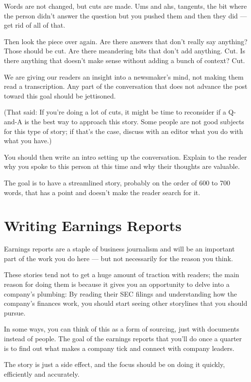 \documentclass[
  11pt,
  american,
  letterpaperpaper,
  extrafontsizes,onecolumn,openright
  ]{memoir}
\begin{document}
Words are not changed, but cuts are made. Ums and ahs, tangents, the bit where the person didn't answer the question but you pushed them and then they did --- get rid of all of that.

Then look the piece over again. Are there answers that don't really say anything? Those should be cut. Are there meandering bits that don't add anything. Cut. Is there anything that doesn't make sense without adding a bunch of context? Cut.

We are giving our readers an insight into a newsmaker's mind, not making them read a transcription. Any part of the conversation that does not advance the post toward this goal should be jettisoned.

(That said: If you're doing a lot of cuts, it might be time to reconsider if a Q-and-A is the best way to approach this story. Some people are not good subjects for this type of story; if that's the case, discuss with an editor what you do with what you have.)

You should then write an intro setting up the conversation. Explain to the reader why you spoke to this person at this time and why their thoughts are valuable.

The goal is to have a streamlined story, probably on the order of 600 to 700 words, that has a point and doesn't make the reader search for it.

\hypertarget{writing-earnings-reports}{%
\chapter{Writing Earnings Reports}\label{writing-earnings-reports}}

Earnings reports are a staple of business journalism and will be an important part of the work you do here --- but not necessarily for the reason you think.

These stories tend not to get a huge amount of traction with readers; the main reason for doing them is because it gives you an opportunity to delve into a company's plumbing: By reading their SEC filings and understanding how the company's finances work, you should start seeing other storylines that you should pursue.

In some ways, you can think of this as a form of sourcing, just with documents instead of people. The goal of the earnings reports that you'll do once a quarter is to find out what makes a company tick and connect with company leaders.

The story is just a side effect, and the focus should be on doing it quickly, efficiently and accurately.
\end{document}
